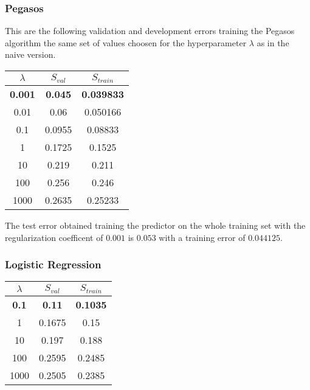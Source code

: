 \subsubsection{Pegasos}
This are the following validation and development errors training the Pegasos algorithm the same set of values choosen for the hyperparameter $\lambda$ as in the naive version.\\

\begin{center}
    \begin{tabular}{| c | c | c |}
        \hline
        $\lambda$ & $S_{val}$ & $S_{train}$ \\
        \hline
        \textbf{0.001} & \textbf{0.045} & \textbf{0.039833} \\
        \hline
        0.01 & 0.06 & 0.050166 \\
        \hline
        0.1 & 0.0955 & 0.08833 \\
        \hline
        1 & 0.1725 & 0.1525 \\
        \hline
        10 & 0.219 & 0.211 \\
        \hline
        100 & 0.256 & 0.246 \\
        \hline
        1000 & 0.2635 & 0.25233 \\
        \hline
    \end{tabular}
\end{center}

The test error obtained training the predictor on the whole training set with the regularization coefficent of $0.001$ is $0.053$ with a training error of $0.044125$.\\

\subsubsection{Logistic Regression}

\begin{center}
    \begin{tabular}{| c | c | c |}
        \hline
        $\lambda$ & $S_{val}$ & $S_{train}$ \\
        \hline
        \textbf{0.1} & \textbf{0.11} & \textbf{0.1035} \\
        \hline
        1 & 0.1675 & 0.15 \\
        \hline
        10 & 0.197 & 0.188 \\
        \hline
        100 & 0.2595 & 0.2485 \\
        \hline
        1000 & 0.2505 & 0.2385 \\
        \hline
    \end{tabular}
\end{center}

